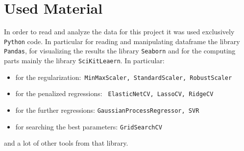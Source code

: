 \documentclass{article}
\begin{document}
\section*{Used Material}
In order to read and analyze the data for this project it was used exclusively \texttt{Python} code. In particular for reading and manipulating dataframe the library \texttt{Pandas}, for visualizing the results the library \texttt{Seaborn} and for the computing parts mainly the library \texttt{SciKitLeaern}.
In particular:

\begin{itemize}
	\item for the regularization:\texttt{ MinMaxScaler, StandardScaler, RobustScaler}
	\item for the penalized regressions: \texttt{ ElasticNetCV, LassoCV, RidgeCV}
	\item for the further regressions: \texttt{GaussianProcessRegressor, SVR}
	\item for searching the best parameters: \texttt{GridSearchCV}
\end{itemize}

and a lot of other tools from that library.

\newpage
\end{document}
